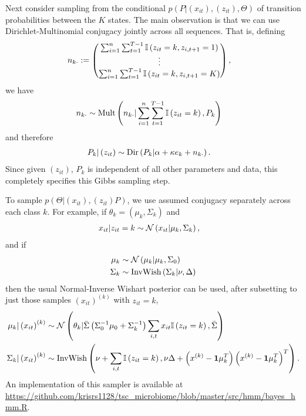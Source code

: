 \documentclass{article}
\begin{document}
Next consider sampling from the conditional $p\left(P \vert
\left(x_{it}\right), \left(z_{it}\right), \Theta\right)$ of transition
probabilities between the $K$ states. The main observation is that we can use
Dirichlet-Multinomial conjugacy jointly across all sequences. That is, defining
\begin{align*}
 n_{k \cdot} &:= \begin{pmatrix} \sum_{i = 1}^{n} \sum_{t = 1}^{T - 1} \mathbb{I}\left({z_{it} = k, z_{i,t + 1} = 1}\right) \\ \vdots \\ \sum_{i = 1}^{n} \sum_{t = 1}^{T - 1} \mathbb{I}\left({z_{it} = k, z_{i,t + 1} = K}\right) \end{pmatrix},
\end{align*}
we have
\begin{align*}
n_{k\cdot} &\sim \textnormal{Mult}\left(n_{k\cdot} \vert \sum_{i = 1}^{n} \sum_{t = 1}^{T - 1} \mathbb{I}\left({z_{it} = k}\right), P_{k}\right)
\end{align*}
and therefore
\begin{align}
  \label{eq:sticky_hmm_p_update}
  P_{k} \vert \left(z_{it}\right) &\sim \textnormal{Dir}\left(P_{k} \vert \alpha + \kappa e_{k} + n_{k\cdot}\right).
\end{align}
Since given $\left(z_{it}\right)$, $P_{k}$ is independent of all other
parameters and data, this completely specifies this Gibbs sampling step.

To sample $p\left(\Theta \vert \left(x_{it}\right), \left(z_{it}\right)
P\right)$, we use assumed conjugacy separately across each class $k$. For
example, if $\theta_{k} = \left(\mu_{k}, \Sigma_{k}\right)$ and
\begin{align*}
  x_{it} \vert z_{it} = k &\sim \mathcal{N}\left(x_{it} \vert \mu_{k}, \Sigma_{k}\right),
\end{align*}
and if
\begin{align*}
  \mu_{k} &\sim \mathcal{N}\left(\mu_{k} \vert \mu_{k}, \Sigma_{0}\right) \\
  \Sigma_{k} &\sim \text{InvWish}\left(\Sigma_{k} \vert \nu, \Delta\right)
\end{align*}
then the usual Normal-Inverse Wishart posterior can be used, after subsetting to just those
samples $\left(x_{it}\right)^{(k)}$ with $z_{it} = k$,
\begin{align*}
  \mu_{k} \vert \left(x_{it}\right)^{(k)} &\sim \mathcal{N}\left(\theta_{k} \vert \bar{\Sigma}\left(\Sigma_0^{-1}\mu_{0} + \Sigma_{k}^{-1}\right) \sum_{i, t} x_{it}\mathbb{I}\left({z_{it} = k}\right), \bar{\Sigma}\right) \\
  \Sigma_{k} \vert \left(x_{it} \right)^{(k)} &\sim  \text{InvWish}\left(\nu + \sum_{i, t} \mathbb{I}\left({z_{it} = k}\right), \nu \Delta + \left(x^{(k)} - \mathbf{1} \mu_{k}^{T}\right)\left(x^{(k)} - \mathbf{1} \mu_{k}^{T}\right)^{T}\right).
\end{align*}
An implementation of this sampler is available at
\href{https://github.com/krisrs1128/tsc\_microbiome/blob/master/src/hmm/bayes\_hmm.R}{https://github.com/krisrs1128/tsc\_microbiome/blob/master/src/hmm/bayes\_hmm.R}.
\end{document}
